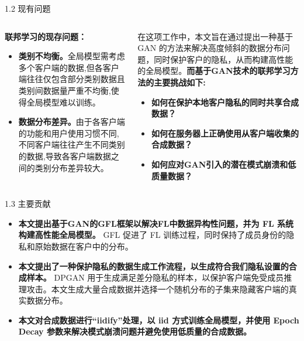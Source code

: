 \documentclass{sintefbeamer}
\theoremstyle{definition}
\begin{document}
\begin{frame}{1.2 现有问题}
\begin{columns}
\begin{column}{0.5\textwidth}
\textbf{联邦学习的现存问题：}
\begin{itemize}
\item \textbf{类别不均衡。}全局模型需考虑多个客户端的数据,但各客户端往往仅包含部分类别数据且类别间数据量严重不均衡,使得全局模型难以训练。
\item \textbf{数据分布差异。}由于各客户端的功能和用户使用习惯不同,不同客户端往往产生不同类别的数据,导致各客户端数据之间的类别分布差异较大。
\end{itemize}
\end{column}
\begin{column}{0.5\textwidth}
在这项工作中，本文旨在通过提出一种基于 GAN 的方法来解决高度倾斜的数据分布问题，同时保护客户的隐私，从而构建高性能的全局模型。\textbf{而基于GAN技术的联邦学习方法的主要挑战如下:}
\begin{itemize}
	\item \textbf{如何在保护本地客户隐私的同时共享合成数据？}
	\item \textbf{如何在服务器上正确使用从客户端收集的合成数据？}
	\item \textbf{如何应对GAN引入的潜在模式崩溃和低质量数据？}
\end{itemize}
\end{column}

\end{columns}
\end{frame}


\begin{frame}{1.3 主要贡献}
\begin{itemize}
\item \textbf{本文提出基于GAN的GFL框架以解决FL中数据异构性问题，并为 FL 系统构建高性能全局模型。 }GFL 促进了 FL 训练过程，同时保持了成员身份的隐私和原始数据在客户中的分布。
\item \textbf{本文提出了一种保护隐私的数据生成工作流程，以生成符合我们隐私设置的合成样本。} DPGAN 用于生成满足差分隐私的样本，以保护客户端免受成员推理攻击。本文生成大量合成数据并选择一个随机分布的子集来隐藏客户端的真实数据分布。
\item \textbf{本文对合成数据进行“iidify”处理，以 iid 方式训练全局模型，并使用 Epoch Decay 参数来解决模式崩溃问题并避免使用低质量的合成数据。}
\end{itemize}
\end{frame}

%
%
%
%
%
\end{document}
